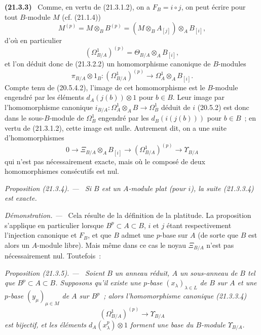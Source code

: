 \documentclass[10pt,oneside]{book}
\makeatletter
\newcommand{\setmanualcurrentlabel}[1]{\def\@currentlabel{#1}}
\newenvironment{env}[1][]{\setmanualcurrentlabel{#1}\par\medskip\noindent\textbf{(#1)}\ }{\par}
\newenvironment{proposition}[1][]{%
  \setmanualcurrentlabel{#1}\par\medskip\noindent\itshape Proposition (#1). ---\ }{\par}
\newenvironment{proof}{%
  \par\medskip\noindent\textit{Démonstration. ---\ }}{\par}
\makeatother
\begin{document}
\begin{env}[21.3.3]
\label{0.21.3.3-fr}
Comme, en vertu de (21.3.1.2), on a $F_B=i\circ j$, on peut écrire pour
tout $B$-module $M$ (cf. (21.1.4))
\begin{equation}
\tag{21.3.3.1}\label{0.21.3.3.1-fr}
M^{(p)}=M\otimes_B B^{(p)}=(M\otimes_B A_{[j]})\otimes_A B_{[i]},
\end{equation}
d'où en particulier
\begin{equation}
\tag{21.3.3.2}\label{0.21.3.3.2-fr}
(\Omega^1_{B/A})^{(p)}=\Theta_{B/A}\otimes_A B_{[i]},
\end{equation}
et l'on déduit donc de (21.3.2.2) un homomorphisme canonique de $B$-modules
\begin{equation}
\tag{21.3.3.3}\label{0.21.3.3.3-fr}
\pi_{B/A}\otimes1_B:(\Omega^1_{B/A})^{(p)}\longrightarrow
\Omega^1_A\otimes_A B_{[i]}.
\end{equation}
Compte tenu de (20.5.4.2), l'image de cet homomorphisme est le $B$-module
engendré par les éléments $d_A(j(b))\otimes1$ pour $b\in B$. Leur image
par l'homomorphisme canonique $i_{B/A}:\Omega^1_A\otimes_A B\to\Omega^1_B$
déduit de $i$ (20.5.2) est donc dans le sous-$B$-module de $\Omega^1_B$
engendré par les $d_B(i(j(b)))$ pour $b\in B$~; en vertu de (21.3.1.2),
cette image est nulle. Autrement dit, on a une suite d'homomorphismes
\begin{equation}
\tag{21.3.3.4}\label{0.21.3.3.4-fr}
0\to\Xi_{B/A}\otimes_A B_{[i]}\to(\Omega^1_{B/A})^{(p)}
\to\Upsilon_{B/A}
\end{equation}
qui n'est pas nécessairement exacte, mais où le composé de deux
homomorphismes consécutifs est nul.
\end{env}

\begin{proposition}[21.3.4]
\label{0.21.3.4-fr}
Si $B$ est un $A$-module plat (pour $i$), la suite (21.3.3.4) est exacte.
\end{proposition}
\begin{proof}
Cela résulte de la définition de la platitude. La proposition s'applique en
particulier lorsque $B^p\subset A\subset B$, $i$ et $j$ étant respectivement
l'injection canonique et $F_B$, et que $B$ admet une $p$-base sur $A$ (de sorte
que $B$ est alors un $A$-module libre). Mais même dans ce cas le noyau
$\Xi_{B/A}$ n'est pas nécessairement nul. Toutefois~:
\end{proof}

\begin{proposition}[21.3.5]
\label{0.21.3.5-fr}
Soient $B$ un anneau réduit, $A$ un sous-anneau de $B$ tel que
$B^p\subset A\subset B$. Supposons qu'il existe une $p$-base
$(x_\lambda)_{\lambda\in L}$ de $B$ sur $A$ et une $p$-base
$(y_\mu)_{\mu\in M}$ de $A$ sur $B^p$~; alors l'homomorphisme canonique
(21.3.3.4)
\begin{equation}
\tag{21.3.5.1}\label{0.21.3.5.1-fr}
(\Omega^1_{B/A})^{(p)}\longrightarrow\Upsilon_{B/A}
\end{equation}
est bijectif, et les éléments $d_A(x_\lambda^p)\otimes1$ forment une base
du $B$-module $\Upsilon_{B/A}$.
\end{proposition}
\end{document}

